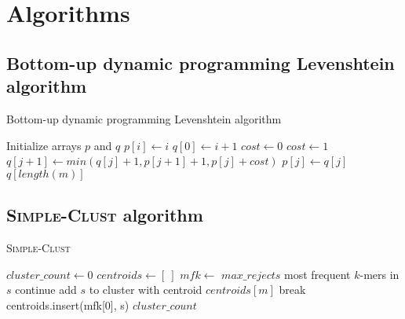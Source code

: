 \section{Algorithms}

\subsection{Bottom-up dynamic programming Levenshtein algorithm}
\label{app:levenshtein_algorithm}

\begin{algorithm}
  \caption{Bottom-up dynamic programming Levenshtein algorithm}
  \label{alg:levenshtein}
  \begin{algorithmic}[1]
    \Statex
      \State Initialize arrays $p$ and $q$
        \State $p[i] \gets i$
      \EndFor
        \State $q[0] \gets i+1$
            \State $cost \gets 0$
          \Else
            \State $cost \gets 1$
          \EndIf
          \State $q[j+1] \gets min(q[j] + 1, p[j+1] + 1, p[j] + cost)$
        \EndFor
          \State $p[j] \gets q[j]$
        \EndFor
      \EndFor
      \State \Return $q[length(m)]$
    \EndFunction
  \end{algorithmic}
\end{algorithm}

\newpage

\subsection{\textsc{Simple-Clust} algorithm}
\label{app:simple-clust}

\begin{algorithm}
  \caption{\textsc{Simple-Clust}}
  \label{alg:simple-clust}
  \begin{algorithmic}[1]
    \Statex
      \State $cluster\_count \gets 0$
      \State $centroids \gets [~]$ 
        \State $mfk \gets$ $max\_rejects$ most frequent $k$-mers in $s$
           \label{alg:line:simple_clust_lookup}
            \State continue
            \State add $s$ to cluster with centroid $centroids[m]$
            \State break
          \EndIf
        \EndFor
          \State centroids.insert(mfk[0], s)
        \EndIf
      \EndFor
      \State \Return $cluster\_count$
    \EndFunction
  \end{algorithmic}
\end{algorithm}
